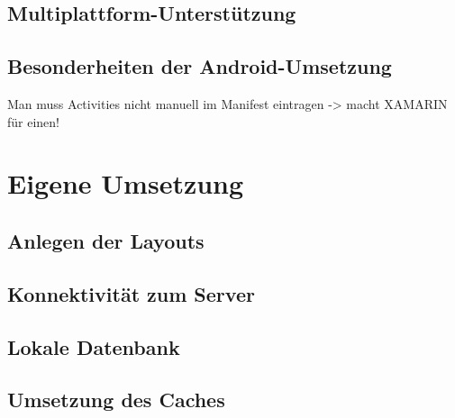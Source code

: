 \subsection{Multiplattform-Unterstützung}
\label{ssec:xamarin-multiplattform}

\subsection{Besonderheiten der Android-Umsetzung}
\label{ssec:xamarin-android}
Man muss Activities nicht manuell im Manifest eintragen -> macht XAMARIN für einen!

\section{Eigene Umsetzung}
\label{sec:nat-umsetzung}

\subsection{Anlegen der Layouts}
\label{ssec:nat-layouts}

\subsection{Konnektivität zum Server}
\label{ssec:nat-konnektivität}

\subsection{Lokale Datenbank}
\label{ssec:nat-db}

\subsection{Umsetzung des Caches}
\label{ssec:nat-cache}
